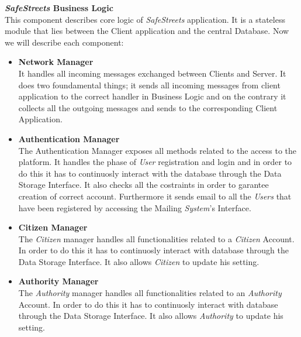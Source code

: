 \documentclass{article}
\begin{document}
\textbf{\textit{SafeStreets} Business Logic} \\
This component describes core logic of \textit{SafeStreets} application. It is a stateless module 
that lies between the Client application and the central Database. Now we will describe each component:
\begin{itemize}
    \item \textbf{Network Manager} \\
    It handles all incoming messages exchanged between Clients and Server. It does two foundamental
    things; it sends all incoming messages from client application to the correct handler in Business
    Logic and on the contrary it collects all the outgoing messages and sends to the corresponding Client
    Application.
    \item \textbf{Authentication Manager} \\
    The Authentication Manager exposes all methods related to the access to the platform. It handles the
    phase of \textit{User} registration and login and in order to do this it has to continuosly interact with 
    the database through the Data Storage Interface. It also checks all the costraints in order to garantee 
    creation of correct account. Furthermore it sends email to all the \textit{Users} that have been registered 
    by accessing the Mailing \textit{System}'s Interface. 
    \item \textbf{Citizen Manager} \\
    The \textit{Citizen} manager handles all functionalities related to a \textit{Citizen} Account. In order to
    do this it has to continuosly interact with database through the Data Storage Interface. It also allows
    \textit{Citizen} to update his setting. 
    \item \textbf{Authority Manager} \\
    The \textit{Authority} manager handles all functionalities related to an \textit{Authority} Account. In order to
    do this it has to continuosly interact with database through the Data Storage Interface. It also allows
    \textit{Authority} to update his setting.

\end{itemize}
\end{document}
